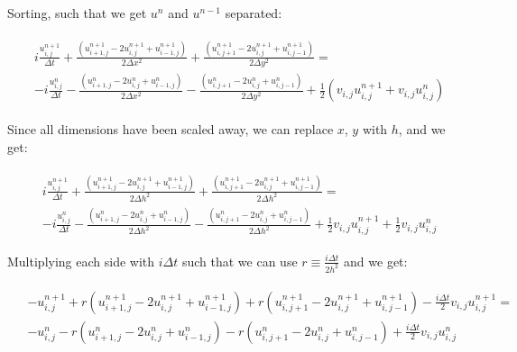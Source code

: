 \documentclass[english,notitlepage,reprint,nofootinbib]{revtex4-1}  %
\begin{document}
Sorting, such that we get $u^n$ and $u^{n-1}$ separated:

\begin{align}
\begin{split}
    &i \frac{u_{i,j}^{n+1}}{\Delta t} + \frac{\left( u_{i+1, j}^{n+1} - 2u_{i, j}^{n+1} + u_{i-1, j}^{n+1} \right)}{2 \Delta x^2} + \frac{\left( u_{i, j+1}^{n+1} - 2u_{i, j}^{n+1} + u_{i, j-1}^{n+1} \right)}{2 \Delta y^2} = \\
    &- i \frac{u_{i,j}^{n}}{\Delta t} - \frac{\left( u_{i+1, j}^{n} - 2u_{i, j}^{n} + u_{i-1, j}^{n} \right)}{2 \Delta x^2} - \frac{\left( u_{i, j+1}^{n} - 2u_{i, j}^{n} + u_{i, j-1}^{n} \right)}{2 \Delta y^2} + \frac{1}{2} \left(v_{i,j} u_{i,j}^{n+1} + v_{i,j} u_{i,j}^n\right)
\end{split}
\end{align}

Since all dimensions have been scaled away, we can replace $x$, $y$ with $h$, and we get:

\begin{align}
\begin{split}
    &i \frac{u_{i,j}^{n+1}}{\Delta t} + \frac{\left( u_{i+1, j}^{n+1} - 2u_{i, j}^{n+1} + u_{i-1, j}^{n+1} \right)}{2 \Delta h^2} + \frac{\left( u_{i, j+1}^{n+1} - 2u_{i, j}^{n+1} + u_{i, j-1}^{n+1} \right)}{2 \Delta h^2} = \\
    &- i \frac{u_{i,j}^{n}}{\Delta t} - \frac{\left( u_{i+1, j}^{n} - 2u_{i, j}^{n} + u_{i-1, j}^{n} \right)}{2 \Delta h^2} - \frac{\left( u_{i, j+1}^{n} - 2u_{i, j}^{n} + u_{i, j-1}^{n} \right)}{2 \Delta h^2} + \frac{1}{2} v_{i,j} u_{i,j}^{n+1} + \frac{1}{2} v_{i,j} u_{i,j}^n
\end{split}
\end{align}

Multiplying each side with $i \Delta t$ such that we can use $r \equiv \frac{i \Delta t}{2h^2}$ and we get:

\begin{align}
\begin{split}
    &- u_{i,j}^{n+1} + r \left( u_{i+1, j}^{n+1} - 2u_{i, j}^{n+1} + u_{i-1, j}^{n+1} \right) + r \left( u_{i, j+1}^{n+1} - 2u_{i, j}^{n+1} + u_{i, j-1}^{n+1} \right) - \frac{i \Delta t}{2} v_{i,j} u_{i,j}^{n+1} = \\
    &- u_{i,j}^{n} - r \left( u_{i+1, j}^{n} - 2u_{i, j}^{n} + u_{i-1, j}^{n} \right) - r \left( u_{i, j+1}^{n} - 2u_{i, j}^{n} + u_{i, j-1}^{n} \right) + \frac{i \Delta t}{2} v_{i,j} u_{i,j}^n
\end{split}
\end{align}
\end{document}
